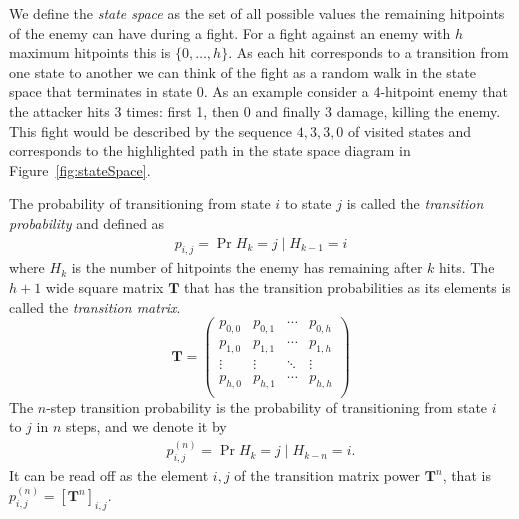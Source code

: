 We define the \textit{state space} as the set of all possible values the remaining hitpoints of the enemy can have during a fight. For a fight against an enemy with $h$ maximum hitpoints this is $\{0,\ldots,h\}$. As each hit corresponds to a transition from one state to another we can think of the fight as a random walk in the state space that terminates in state 0. As an example consider a 4-hitpoint enemy that the attacker hits 3 times: first 1, then 0 and finally 3 damage, killing the enemy. This fight would be described by the sequence $4,3,3,0$ of visited states and corresponds to the highlighted path in the state space diagram in Figure~\ref{fig:stateSpace}.

The probability of transitioning from state $i$ to state $j$ is called the \textit{transition probability} and defined as
\begin{align}\label{eq:transitionProbabilities}
    p_{i,j} = \Pr{H_k = j \mid H_{k-1} = i}
\end{align}
where $H_k$ is the number of hitpoints the enemy has remaining after $k$ hits. The $h+1$ wide square matrix $\mathbf{T}$ that has the transition probabilities as its elements is called the \emph{transition matrix}.
\begin{equation}\label{eq:transitionMatrix}
	\mathbf{T} =
	\begin{pmatrix}
		p_{0,0} & p_{0,1} & \cdots & p_{0,h}\\
		p_{1,0} & p_{1,1} & \cdots & p_{1,h}\\
		\vdots & \vdots & \ddots & \vdots\\
		p_{h,0} & p_{h,1} & \cdots & p_{h,h}\\
	\end{pmatrix}
\end{equation}
The $n$-step transition probability is the probability of transitioning from state $i$ to $j$ in $n$ steps, and we denote it by
\begin{align}\label{eq:nstepTransitionProbabilities}
	p_{i,j}^{(n)} = \Pr{H_k = j \mid H_{k-n} = i}.
\end{align}
It can be read off as the element $i,j$ of the transition matrix power $\mathbf{T}^n$, that is $p_{i,j}^{(n)} = [\mathbf{T}^n]_{i,j}$.

